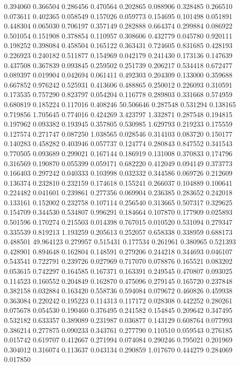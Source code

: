 0.394060
0.366504
0.286456
0.470564
0.202865
0.088906
0.328485
0.266510
0.073611
0.402365
0.058549
0.157026
0.059773
0.154695
0.101498
0.051891
0.448304
0.065030
0.706197
0.357149
0.282888
0.664374
0.299884
0.086922
0.501054
0.151908
0.378854
0.110957
0.308606
0.432779
0.045780
0.920111
0.198252
0.398084
0.458504
0.165122
0.363431
0.724605
0.831685
0.428193
0.226923
0.240182
0.511877
0.154969
0.042179
0.241430
0.173136
0.147639
0.437508
0.367839
0.093845
0.259502
0.251739
0.206217
0.534418
0.672477
0.089397
0.019904
0.042694
0.061411
0.492303
0.204309
0.133000
0.359688
0.667852
0.976242
0.525931
0.413606
0.488865
0.250012
0.226093
0.310591
0.173535
0.757290
0.823797
0.054204
0.116778
0.289803
0.331668
0.574959
0.680819
0.185224
0.117016
0.408246
50.506646
0.287548
0.531294
0.138165
0.719856
1.705645
0.774016
0.424269
3.423797
1.332871
0.287548
0.194815
0.197962
0.093382
0.193945
0.357805
0.530985
1.629793
0.219233
0.175559
0.127574
0.271747
0.087250
1.038565
0.028546
0.314103
0.083720
0.150177
0.140283
0.458282
0.403946
0.057737
0.124774
0.280843
0.847552
0.341543
0.770505
0.093689
0.299021
0.167144
0.186919
0.131008
0.370833
0.174796
0.316569
0.190870
0.055399
0.059171
0.682220
0.412049
0.094149
0.373773
0.166403
0.297242
0.040333
0.103998
0.032332
0.344586
0.069726
0.212609
0.136374
0.232810
0.232159
0.174618
0.155241
0.266037
0.104889
0.100641
0.224482
0.041601
0.239861
0.277356
0.069904
0.236385
0.283652
0.242018
0.133161
0.152002
0.232758
0.107114
0.256540
0.313665
0.507317
0.329625
0.154709
0.344530
0.534807
0.996291
0.184664
0.107870
0.177909
0.025893
0.501596
0.170274
0.215503
0.014398
0.767015
0.010520
0.531094
0.279347
0.335539
0.819213
1.193259
0.205613
0.252057
0.658338
0.338959
0.688173
0.488501
49.964123
0.279957
0.515431
0.177534
0.261961
0.380965
0.521393
0.428901
0.894648
0.162804
0.148591
0.279206
0.244218
0.344693
0.046107
0.543541
0.722791
0.239726
0.027969
0.717070
0.078876
0.165521
0.083202
0.053615
0.742297
0.164585
0.167371
0.163391
0.249545
0.470807
0.093025
0.114523
0.160552
0.204849
0.162870
0.475096
0.279145
0.165720
0.237848
0.382158
0.032884
0.163420
0.558736
0.594084
0.079672
0.460826
0.459938
0.363084
0.220242
0.195223
0.114313
0.117172
0.028308
0.442252
0.280261
0.075678
0.054530
0.190460
0.376495
0.241582
0.154845
0.209642
0.347495
0.532182
0.633357
0.389089
0.231987
0.036877
0.143129
0.608764
0.077993
0.386214
0.277875
0.090233
0.343761
0.277790
0.110510
0.059543
0.276185
0.015742
0.619707
0.412667
0.271994
0.074084
0.290246
0.795021
0.201969
0.304012
0.316074
0.113637
0.043134
0.290859
1.017670
0.444279
0.284069
0.017850
